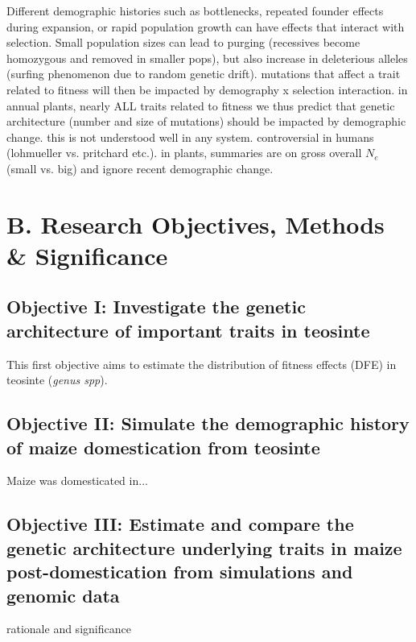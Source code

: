 Different demographic histories such as bottlenecks, repeated founder effects during expansion, or rapid population growth can have effects that interact with selection.
Small population sizes can lead to purging (recessives become homozygous and removed in smaller pops), but also increase in deleterious alleles (surfing phenomenon due to random genetic drift).
mutations that affect a trait related to fitness will then be impacted by demography x selection interaction.
in annual plants, nearly ALL traits related to fitness
we thus predict that genetic architecture (number and size of mutations) should be impacted by demographic change.
this is not understood well in any system. controversial in humans (lohmueller vs. pritchard etc.). in plants, summaries are on gross overall $N_e$ (small vs. big) and ignore recent demographic change.





\section*{B. Research Objectives, Methods \& Significance}
\subsection*{Objective I: Investigate the genetic architecture of important traits in teosinte}

This first objective aims to estimate the distribution of fitness effects (DFE) in teosinte (\emph{genus spp}).


\subsection*{Objective II: Simulate the demographic history of maize domestication from teosinte}
Maize was domesticated in...


\subsection*{Objective III: Estimate and compare the genetic architecture underlying traits in maize post-domestication from simulations and genomic data} 
 rationale and significance













